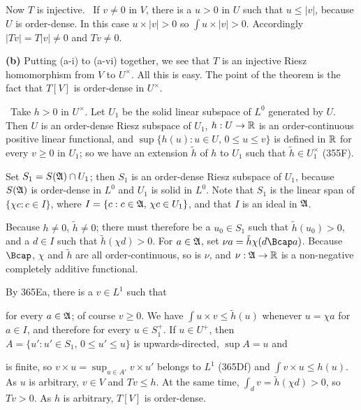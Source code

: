 {\medskip
     
 Now $T$ is injective.   \Prf\ If $v\ne 0$ in $V$, there
is a $u>0$ in $U$ such that $u\le|v|$, because $U$ is order-dense.   In
this case $u\times|v|>0$ so $\int u\times|v|>0$.   Accordingly
$|Tv|=T|v|\ne 0$ and $Tv\ne 0$.\ \Qed
     
\medskip
     
{\bf (b)} Putting (a-i) to (a-vi) together, we see that $T$ is an
injective Riesz homomorphism from $V$ to $U^{\times}$.   All this is
easy.    The point of the theorem is the fact that $T[V]$ is order-dense
in $U^{\times}$.
     
\Prf\  Take $h>0$ in $U^{\times}$.
Let $U_1$ be the solid linear subspace of $L^0$ generated by $U$.   Then
$U$ is an order-dense Riesz subspace of $U_1$, $h:U\to\Bbb R$ is an
order-continuous positive linear functional, and 
$\sup\{h(u):u\in U,\,0\le u\le v\}$ is defined in $\Bbb R$ for every 
$v\ge 0$ in $U_1$;  so we have an 
extension $\tilde h$ of $h$ to $U_1$ such that $\tilde h\in U_1^{\times}$ 
(355F).
     
Set $S_1=S(\frak A)\cap U_1$;  then $S_1$ is an order-dense Riesz
subspace of $U_1$, because $S(\frak A)$ is order-dense in $L^0$ and
$U_1$ is solid in $L^0$.   Note
that $S_1$ is the linear span of $\{\chi c:c\in I\}$, where
$I=\{c:c\in\frak A,\,\chi c\in U_1\}$, and that $I$ is an ideal in
$\frak A$.
     
Because $h\ne 0$, $\tilde h\ne 0$;  there must therefore be a 
$u_0\in S_1$ such that $\tilde h(u_0)>0$, and a $d\in I$ such that $\tilde h(\chi d)>0$.   For $a\in\frak A$, set 
$\nu a=\tilde h\chi(d\Bcap a)$.
Because $\Bcap$, $\chi$ and $\tilde h$ are all order-continuous, so is
$\nu$, and $\nu:\frak A\to\Bbb R$ is a non-negative completely additive
functional.
     
By 365Ea, there is a $v\in L^1$ such that
     
     
\noindent for every $a\in\frak A$;  of course $v\ge 0$.   We have
$\int u\times v\le \tilde h(u)$ whenever $u=\chi a$ for $a\in I$, and
therefore for every $u\in S_1^+$.   If $u\in U^+$, then
$A=\{u':u'\in S_1,\,0\le u'\le u\}$ is upwards-directed, $\sup A=u$ and
     
     
\noindent is finite, so $v\times u=\sup_{u\in A'}v\times u'$ belongs to
$L^1$ (365Df) and $\int v\times u\le h(u)$.   As $u$
is arbitrary, $v\in V$ and $Tv\le h$.   At the same time,
$\int_dv=\tilde h(\chi d)>0$, so $Tv>0$.   As $h$ is arbitrary, $T[V]$
is order-dense.\ \Qed
     
}
